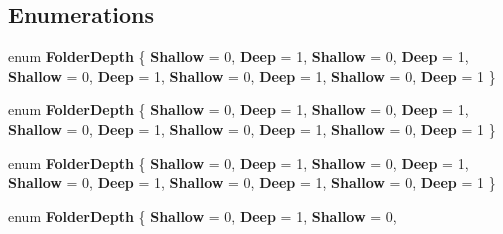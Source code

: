 \subsection*{Enumerations}
\begin{DoxyCompactItemize}
\item 
\mbox{\label{namespace_windows_1_1_storage_1_1_search_ab15c89d1838f508affd2b26fb037d399}} 
enum {\bfseries Folder\+Depth} \{ \newline
{\bfseries Shallow} = 0, 
{\bfseries Deep} = 1, 
{\bfseries Shallow} = 0, 
{\bfseries Deep} = 1, 
\newline
{\bfseries Shallow} = 0, 
{\bfseries Deep} = 1, 
{\bfseries Shallow} = 0, 
{\bfseries Deep} = 1, 
\newline
{\bfseries Shallow} = 0, 
{\bfseries Deep} = 1
 \}
\item 
\mbox{\label{namespace_windows_1_1_storage_1_1_search_ab15c89d1838f508affd2b26fb037d399}} 
enum {\bfseries Folder\+Depth} \{ \newline
{\bfseries Shallow} = 0, 
{\bfseries Deep} = 1, 
{\bfseries Shallow} = 0, 
{\bfseries Deep} = 1, 
\newline
{\bfseries Shallow} = 0, 
{\bfseries Deep} = 1, 
{\bfseries Shallow} = 0, 
{\bfseries Deep} = 1, 
\newline
{\bfseries Shallow} = 0, 
{\bfseries Deep} = 1
 \}
\item 
\mbox{\label{namespace_windows_1_1_storage_1_1_search_ab15c89d1838f508affd2b26fb037d399}} 
enum {\bfseries Folder\+Depth} \{ \newline
{\bfseries Shallow} = 0, 
{\bfseries Deep} = 1, 
{\bfseries Shallow} = 0, 
{\bfseries Deep} = 1, 
\newline
{\bfseries Shallow} = 0, 
{\bfseries Deep} = 1, 
{\bfseries Shallow} = 0, 
{\bfseries Deep} = 1, 
\newline
{\bfseries Shallow} = 0, 
{\bfseries Deep} = 1
 \}
\item 
\mbox{\label{namespace_windows_1_1_storage_1_1_search_ab15c89d1838f508affd2b26fb037d399}} 
enum {\bfseries Folder\+Depth} \{ \newline
{\bfseries Shallow} = 0, 
{\bfseries Deep} = 1, 
{\bfseries Shallow} = 0, 

\end{DoxyCompactItemize}

